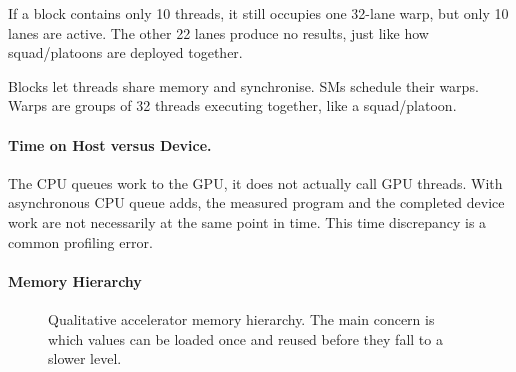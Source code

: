 If a block contains only 10 threads, it still occupies one 32-lane warp, but only 10 lanes are active.
The other 22 lanes produce no results, just like how squad/platoons are deployed together.

\begin{calloutmemoryhook}
Blocks let threads share memory and synchronise.
SMs schedule their warps.
Warps are groups of 32 threads executing together, like a squad/platoon.
\end{calloutmemoryhook}

\paragraph{Time on Host versus Device.}

The CPU queues work to the GPU, it does not actually call GPU threads.
With asynchronous CPU queue adds, the measured program and the completed device work are not necessarily at the same point in time.
This time discrepancy is a common profiling error.

\paragraph{Memory Hierarchy}
\begin{figure}[H]
\centering
{}
\caption{Qualitative accelerator memory hierarchy. 
The main concern is which values can be loaded once and reused before they fall to a slower level.}
\label{fig:gpu-memory-hierarchy}
\end{figure}

